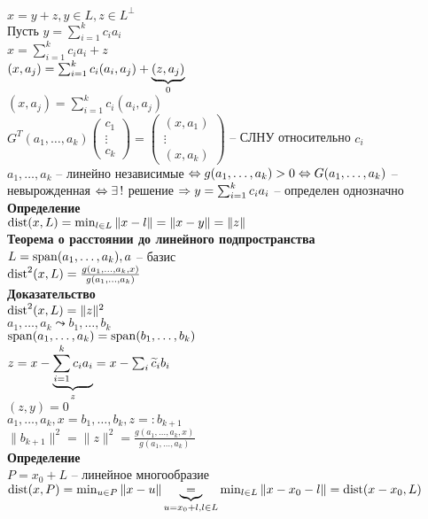 \documentclass[12pt]{article}
\begin{document}
$x = y + z, y \in L, z \in L^\perp$\\
Пусть $y = \sum_{i=1}^k c_i a_i$\\
$x = \sum_{i=1}^k c_ia_i + z$\\
$(x, a_j) = \sum_{i=1}^k c_i (a_i, a_j) + \ub0{(z, a_j)}$\\
$(x, a_j) = \sum_{i=1}^k c_i (a_i, a_j)$\\
$G^T(a_1, \ldots, a_k)\begin{pmatrix}
    c_1\\\vdots\\c_k
\end{pmatrix} = \begin{pmatrix}
    (x, a_1)\\\vdots\\(x,a_k)
\end{pmatrix}$ -- СЛНУ относительно $c_i$\\
$a_1, \ldots, a_k$ -- линейно независимые $\LRto g(a_1, \ldots, a_k) > 0 \LRto G(a_1,\ldots, a_k)$ -- невырожденная $\LRto \ex!$ решение $\Rto y = \sum_{i=1}^k c_i a_i$ -- определен однозначно\\
\textbf{Определение}\\
$\dist(x, L) = \min_{l\in L} \|x-l\| = \|x-y\|=\|z\|$\\
\textbf{Теорема о расстоянии до линейного подпространства}\\
$L = \span(a_1, \ldots, a_k), a$ -- базис\\
$\dist^2(x,L) = \frac{g(a_1, \ldots, a_k, x)}{g(a_1, \ldots, a_k)}$\\
\textbf{Доказательство}\\
$\dist^2(x,L) = \|z\|^2$\\
$a_1, \ldots, a_k \leadsto b_1, \ldots, b_k$\\
$\span(a_1, \ldots, a_k) = \span(b_1, \ldots, b_k)$\\
$z = x - \ub{z}{\sum_{i=1}^k c_ia_i} = x - \sum_i \ot c_i b_i$\\
$(z, y) = 0$\\
$a_1, \ldots, a_k, x = b_1, \ldots, b_k, z =: b_{k+1}$\\
$\|b_{k+1}\|^2 = \|z\|^2 = \frac{g(a_1, \ldots, a_k, x)}{g(a_1, \ldots, a_k)}$\\
\textbf{Определение}\\
$P = x_0 + L$ -- линейное многообразие\\
$\dist(x, P) = \min_{u \in P} \|x-u\| \ub{u = x_0 + l, l \in L}= \min_{l \in L} \|x-x_0-l\| = \dist(x-x_0, L)$\\\\
\end{document}
